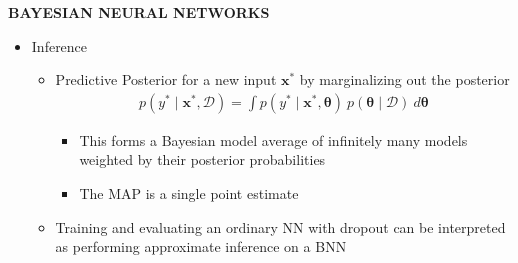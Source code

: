 \begin{whitebox}{\textbf{BAYESIAN NEURAL NETWORKS}}
\begin{itemize}
\begin{itemize}
            \item Posterior captures the entire loss landscape, MAP only a single point
        \end{itemize}
        \item Inference
        \begin{itemize}
            \item Predictive Posterior for a new input $\bm{x}^*$ by marginalizing out the posterior
            \begin{align*}
                p(y^*\mid\bm{x}^*,\mathcal{D})=\int p(y^*\mid\bm{x}^*,\bm{\theta})\ p(\bm{\theta}\mid\mathcal{D})\ d\bm{\theta}
            \end{align*}
            \begin{itemize}
                \item This forms a Bayesian model average of infinitely many models weighted by their posterior probabilities
                \item The MAP is a single point estimate
            \end{itemize}
            \item Training and evaluating an ordinary NN with dropout can be interpreted as performing approximate inference on a BNN
        \end{itemize}
    \end{itemize}
\end{whitebox}

